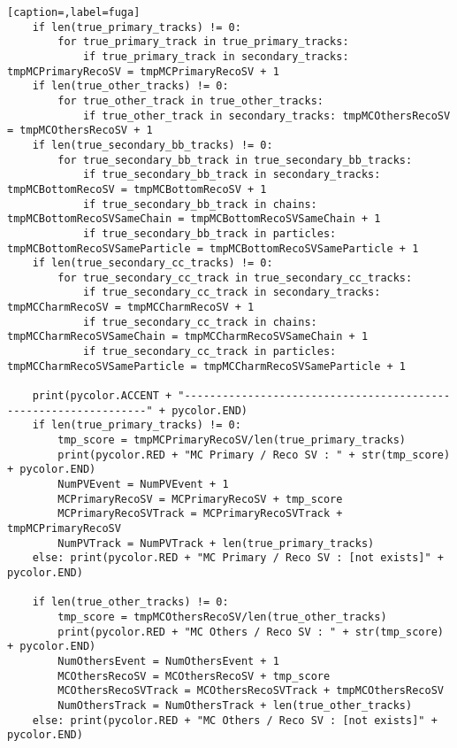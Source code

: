 \begin{lstlisting}[caption=,label=fuga]
    if len(true_primary_tracks) != 0:
        for true_primary_track in true_primary_tracks:
            if true_primary_track in secondary_tracks: tmpMCPrimaryRecoSV = tmpMCPrimaryRecoSV + 1
    if len(true_other_tracks) != 0:
        for true_other_track in true_other_tracks:
            if true_other_track in secondary_tracks: tmpMCOthersRecoSV = tmpMCOthersRecoSV + 1
    if len(true_secondary_bb_tracks) != 0:
        for true_secondary_bb_track in true_secondary_bb_tracks:
            if true_secondary_bb_track in secondary_tracks: tmpMCBottomRecoSV = tmpMCBottomRecoSV + 1
            if true_secondary_bb_track in chains: tmpMCBottomRecoSVSameChain = tmpMCBottomRecoSVSameChain + 1
            if true_secondary_bb_track in particles: tmpMCBottomRecoSVSameParticle = tmpMCBottomRecoSVSameParticle + 1
    if len(true_secondary_cc_tracks) != 0:
        for true_secondary_cc_track in true_secondary_cc_tracks:
            if true_secondary_cc_track in secondary_tracks: tmpMCCharmRecoSV = tmpMCCharmRecoSV + 1
            if true_secondary_cc_track in chains: tmpMCCharmRecoSVSameChain = tmpMCCharmRecoSVSameChain + 1
            if true_secondary_cc_track in particles: tmpMCCharmRecoSVSameParticle = tmpMCCharmRecoSVSameParticle + 1

    print(pycolor.ACCENT + "----------------------------------------------------------------" + pycolor.END)
    if len(true_primary_tracks) != 0:
        tmp_score = tmpMCPrimaryRecoSV/len(true_primary_tracks)
        print(pycolor.RED + "MC Primary / Reco SV : " + str(tmp_score) + pycolor.END)
        NumPVEvent = NumPVEvent + 1
        MCPrimaryRecoSV = MCPrimaryRecoSV + tmp_score
        MCPrimaryRecoSVTrack = MCPrimaryRecoSVTrack + tmpMCPrimaryRecoSV
        NumPVTrack = NumPVTrack + len(true_primary_tracks)
    else: print(pycolor.RED + "MC Primary / Reco SV : [not exists]" + pycolor.END)

    if len(true_other_tracks) != 0:
        tmp_score = tmpMCOthersRecoSV/len(true_other_tracks)
        print(pycolor.RED + "MC Others / Reco SV : " + str(tmp_score) + pycolor.END)
        NumOthersEvent = NumOthersEvent + 1
        MCOthersRecoSV = MCOthersRecoSV + tmp_score
        MCOthersRecoSVTrack = MCOthersRecoSVTrack + tmpMCOthersRecoSV
        NumOthersTrack = NumOthersTrack + len(true_other_tracks)
    else: print(pycolor.RED + "MC Others / Reco SV : [not exists]" + pycolor.END)


\end{lstlisting}
